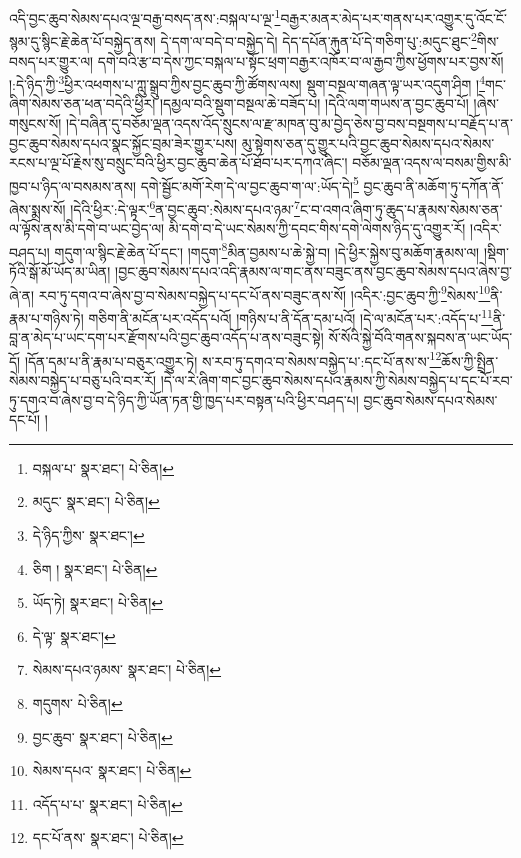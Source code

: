 འདི་བྱང་ཆུབ་སེམས་དཔའ་ལྔ་བརྒྱ་བསད་ནས་:བསྐལ་པ་ལྔ་\footnote{བསྐལ་པ་  སྣར་ཐང་།  པེ་ཅིན། }བརྒྱར་མནར་མེད་པར་གནས་པར་འགྱུར་དུ་འོང་ངོ་སྙམ་དུ་སྙིང་རྗེ་ཆེན་པོ་བསྐྱེད་ནས། དེ་དག་ལ་བདེ་བ་བསྐྱེད་དེ། དེད་དཔོན་རྐུན་པོ་དེ་གཅིག་པུ་:མདུང་ཐུང་\footnote{མདུང་  སྣར་ཐང་།  པེ་ཅིན། }གིས་བསད་པར་གྱུར་ལ། དགེ་བའི་རྩ་བ་དེས་ཀྱང་བསྐལ་པ་སྟོང་ཕྲག་བརྒྱར་འཁོར་བ་ལ་རྒྱབ་ཀྱིས་ཕྱོགས་པར་བྱས་སོ། །:དེ་ཉིད་ཀྱི་\footnote{དེ་ཉིད་ཀྱིས་  སྣར་ཐང་། }ཕྱིར་འཕགས་པ་ཀླུ་སྒྲུབ་ཀྱིས་བྱང་ཆུབ་ཀྱི་ཚོགས་ལས། སྡུག་བསྔལ་གཞན་ལྟ་ཡར་འདུག་ཤིག །\footnote{ཅིག །  སྣར་ཐང་།  པེ་ཅིན། }གང་ཞིག་སེམས་ཅན་ཕན་བདེའི་ཕྱིར། །དམྱལ་བའི་སྡུག་བསྔལ་ཆེ་བཟོད་པ། །དེའི་ལག་གཡས་ན་བྱང་ཆུབ་པོ། །ཞེས་གསུངས་སོ། །དེ་བཞིན་དུ་བཅོམ་ལྡན་འདས་འོད་སྲུངས་ལ་རྫ་མཁན་བུ་མ་བྱེད་ཅེས་བྱ་བས་བསྔགས་པ་བརྗོད་པ་ན་བྱང་ཆུབ་སེམས་དཔའ་སྣང་སྐྱོང་བྲམ་ཟེར་གྱུར་པས། མུ་སྟེགས་ཅན་དུ་གྱུར་པའི་བྱང་ཆུབ་སེམས་དཔའ་སེམས་རངས་པ་ལྔ་པོ་རྗེས་སུ་བསྲུང་བའི་ཕྱིར་བྱང་ཆུབ་ཆེན་པོ་ཐོབ་པར་དཀའ་ཞིང་། བཅོམ་ལྡན་འདས་ལ་བསམ་གྱིས་མི་ཁྱབ་པ་ཉིད་ལ་བསམས་ནས། དགེ་སྦྱོང་མགོ་རེག་དེ་ལ་བྱང་ཆུབ་ག་ལ་:ཡོད་དེ།\footnote{ཡོད་ཏེ།  སྣར་ཐང་།  པེ་ཅིན། } བྱང་ཆུབ་ནི་མཆོག་ཏུ་དཀོན་ནོ་ཞེས་སྨྲས་སོ། །དེའི་ཕྱིར་:དེ་ལྟར་\footnote{དེ་ལྟ་  སྣར་ཐང་། }ན་བྱང་ཆུབ་:སེམས་དཔའ་ཉམ་\footnote{སེམས་དཔའ་ཉམས་  སྣར་ཐང་།  པེ་ཅིན། }ང་བ་འགའ་ཞིག་ཏུ་ཆུད་པ་རྣམས་སེམས་ཅན་ལ་ལྟོས་ནས་མི་དགེ་བ་ཡང་བྱེད་ལ། མི་དགེ་བ་དེ་ཡང་སེམས་ཀྱི་དབང་གིས་དགེ་ལེགས་ཉིད་དུ་འགྱུར་རོ། །འདིར་བཤད་པ། གདུག་ལ་སྙིང་རྗེ་ཆེན་པོ་དང་། །གདུག་\footnote{གདུགས་  པེ་ཅིན། }མིན་བྱམས་པ་ཆེ་སྐྱེ་བ། །དེ་ཕྱིར་སྐྱེས་བུ་མཆོག་རྣམས་ལ། །སྡིག་ཏོའི་སྒོ་མོ་ཡོད་མ་ཡིན། །བྱང་ཆུབ་སེམས་དཔའ་འདི་རྣམས་ལ་གང་ནས་བཟུང་ནས་བྱང་ཆུབ་སེམས་དཔའ་ཞེས་བྱ་ཞེ་ན། རབ་ཏུ་དགའ་བ་ཞེས་བྱ་བ་སེམས་བསྐྱེད་པ་དང་པོ་ནས་བཟུང་ནས་སོ། །འདིར་:བྱང་ཆུབ་ཀྱི་\footnote{བྱང་ཆུབ་  སྣར་ཐང་།  པེ་ཅིན། }སེམས་\footnote{སེམས་དཔའ་  སྣར་ཐང་།  པེ་ཅིན། }ནི་རྣམ་པ་གཉིས་ཏེ། གཅིག་ནི་མངོན་པར་འདོད་པའོ། །གཉིས་པ་ནི་དོན་དམ་པའོ། །དེ་ལ་མངོན་པར་:འདོད་པ་\footnote{འདོད་པ་པ་  སྣར་ཐང་།  པེ་ཅིན། }ནི་བླ་ན་མེད་པ་ཡང་དག་པར་རྫོགས་པའི་བྱང་ཆུབ་འདོད་པ་ནས་བཟུང་སྟེ། སོ་སོའི་སྐྱེ་བོའི་གནས་སྐབས་ན་ཡང་ཡོད་དོ། །དོན་དམ་པ་ནི་རྣམ་པ་བཅུར་འགྱུར་ཏེ། ས་རབ་ཏུ་དགའ་བ་སེམས་བསྐྱེད་པ་:དང་པོ་ནས་ས་\footnote{དང་པོ་ནས་  སྣར་ཐང་།  པེ་ཅིན། }ཆོས་ཀྱི་སྤྲིན་སེམས་བསྐྱེད་པ་བཅུ་པའི་བར་རོ། །དེ་ལ་རེ་ཞིག་གང་བྱང་ཆུབ་སེམས་དཔའ་རྣམས་ཀྱི་སེམས་བསྐྱེད་པ་དང་པོ་རབ་ཏུ་དགའ་བ་ཞེས་བྱ་བ་དེ་ཉིད་ཀྱི་ཡོན་ཏན་གྱི་ཁྱད་པར་བསྟན་པའི་ཕྱིར་བཤད་པ། བྱང་ཆུབ་སེམས་དཔའ་སེམས་དང་པོ། །
